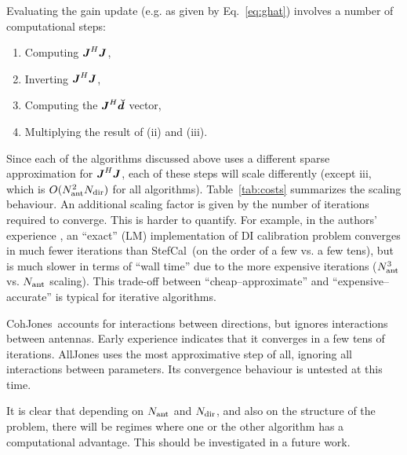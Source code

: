\documentclass[useAMS,usenatbib]{mn2e}
\newcommand{\mat}[1]{{\bmath{#1}}}
\newcommand{\JJ}{\mat{J}} %
\newcommand{\JHJ}{\JJ^H\JJ} %
\newcommand{\COH}{{\sc CohJones}}
\newcommand{\StefCal}{{\sc StefCal}}
\begin{document}
Evaluating the gain update (e.g. as given by Eq.~\ref{eq:ghat}) involves a number of computational steps:

\begin{enumerate}
\item Computing $\JHJ$,
\item Inverting $\JHJ$,
\item Computing the $\JJ^H\Dd$ vector,
\item Multiplying the result of (ii) and (iii). 
\end{enumerate}

Since each of the algorithms discussed above uses a different sparse approximation for $\JHJ$, each of these 
steps will scale differently (except iii, which is $O(N_\mathrm{ant}^2N_\mathrm{dir})$ for all algorithms). Table~\ref{tab:costs} 
summarizes the scaling behaviour. 
An additional scaling factor is given by the number of iterations required to converge. This is harder
to quantify. For example, in the authors' experience \citep{OMS-Stefcal}, an ``exact'' (LM) implementation of
DI calibration problem converges in much fewer iterations than \StefCal\ (on the order of a few vs. a few tens), but is much 
slower in terms of ``wall time'' due to the more expensive iterations ($N_\mathrm{ant}^3$ vs. $N_\mathrm{ant}$ scaling). This trade-off  
between ``cheap--approximate'' and ``expensive--accurate'' is typical for iterative algorithms. 

\COH\ accounts for interactions between directions, but ignores interactions between antennas. Early experience 
indicates that it converges in a few tens of iterations. {\sc AllJones} uses the most approximative step of all,
ignoring all interactions between parameters. Its convergence behaviour is untested at this time.

It is clear that depending on $N_\mathrm{ant}$ and $N_\mathrm{dir}$, and also on the structure of the problem, there will be 
regimes where one or the other algorithm has a computational advantage. This should be investigated in a future work.
\end{document}
